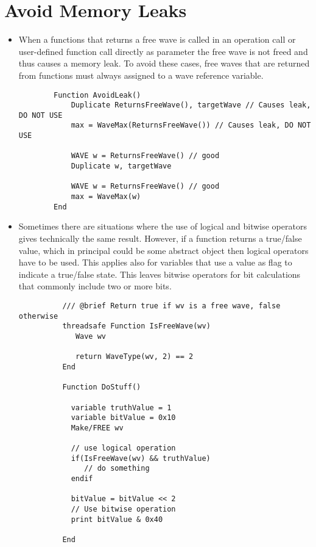 \documentclass{scrartcl}
\begin{document}
\section{Avoid Memory Leaks}
%
\begin{itemize}
  \item When a functions that returns a free wave is called in an operation call or user-defined function call
directly as parameter the free wave is not freed and thus causes a memory leak.
To avoid these cases, free waves that are returned from functions must always assigned to a wave reference variable.
	\begin{verbatim}
		Function AvoidLeak()
			Duplicate ReturnsFreeWave(), targetWave // Causes leak, DO NOT USE
			max = WaveMax(ReturnsFreeWave()) // Causes leak, DO NOT USE

			WAVE w = ReturnsFreeWave() // good
			Duplicate w, targetWave

			WAVE w = ReturnsFreeWave() // good
			max = WaveMax(w)
		End
	\end{verbatim}
\end{itemize}

\begin{itemize}
	\item Sometimes there are situations where the use of logical and bitwise operators gives technically the same result.
	However, if a function returns a true/false value, which in principal could be some abstract object then logical operators have to be used.
	This applies also for variables that use a value as flag to indicate a true/false state.
	This leaves bitwise operators for bit calculations that commonly include two or more bits.
	  \begin{verbatim}
		  /// @brief Return true if wv is a free wave, false otherwise
		  threadsafe Function IsFreeWave(wv)
		     Wave wv

			 return WaveType(wv, 2) == 2
		  End

		  Function DoStuff()

            variable truthValue = 1
            variable bitValue = 0x10
			Make/FREE wv

			// use logical operation
			if(IsFreeWave(wv) && truthValue)
			   // do something
			endif

            bitValue = bitValue << 2
			// Use bitwise operation
			print bitValue & 0x40

		  End
	  \end{verbatim}
  \end{itemize}
\end{document}
